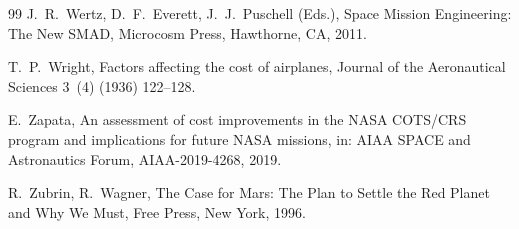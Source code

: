 \documentclass[preprint,12pt]{elsarticle}
\begin{document}
\begin{thebibliography}{99}
J.~R.~Wertz, D.~F.~Everett, J.~J.~Puschell (Eds.),
\newblock Space Mission Engineering: The New SMAD,
\newblock Microcosm Press, Hawthorne, CA, 2011.

T.~P.~Wright,
\newblock Factors affecting the cost of airplanes,
\newblock Journal of the Aeronautical Sciences 3~(4) (1936) 122--128.

E.~Zapata,
\newblock An assessment of cost improvements in the NASA COTS/CRS program and implications for future NASA missions,
\newblock in: AIAA SPACE and Astronautics Forum, AIAA-2019-4268, 2019.

R.~Zubrin, R.~Wagner,
\newblock The Case for Mars: The Plan to Settle the Red Planet and Why We Must,
\newblock Free Press, New York, 1996.

\end{thebibliography}
\end{document}
